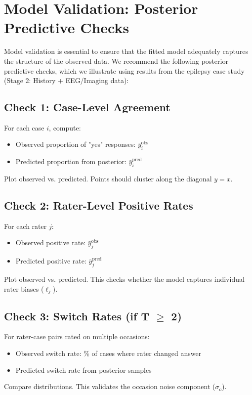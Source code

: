 \section*{Model Validation: Posterior Predictive Checks}\label{section-ppc}

Model validation is essential to ensure that the fitted model adequately captures the structure of the observed data. We recommend the following posterior predictive checks, which we illustrate using results from the epilepsy case study (Stage 2: History + EEG/Imaging data):

\subsection*{Check 1: Case-Level Agreement}

For each case $i$, compute:
\begin{itemize}
    \item Observed proportion of "yes" responses: $\bar{y}_i^{\text{obs}}$
    \item Predicted proportion from posterior: $\bar{y}_i^{\text{pred}}$
\end{itemize}
Plot observed vs. predicted. Points should cluster along the diagonal $y = x$.

\subsection*{Check 2: Rater-Level Positive Rates}

For each rater $j$:
\begin{itemize}
    \item Observed positive rate: $\bar{y}_j^{\text{obs}}$
    \item Predicted positive rate: $\bar{y}_j^{\text{pred}}$
\end{itemize}
Plot observed vs. predicted. This checks whether the model captures individual rater biases ($\ell_j$).

\subsection*{Check 3: Switch Rates (if T $\geq$ 2)}

For rater-case pairs rated on multiple occasions:
\begin{itemize}
    \item Observed switch rate: \% of cases where rater changed answer
    \item Predicted switch rate from posterior samples
\end{itemize}
Compare distributions. This validates the occasion noise component ($\sigma_o$).

